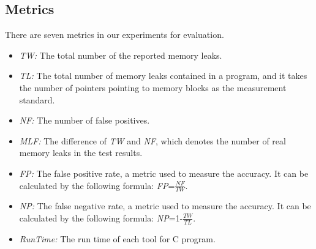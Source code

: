 \subsection{Metrics}\label{ssec:m}
There are seven metrics in our experiments for evaluation.
\begin{itemize}
\item \textit{TW:} The total number of the reported memory leaks.
\item \textit{TL:} The total number of memory leaks contained in a program, and it takes the number of pointers pointing to memory blocks as the measurement standard.
\item \textit{NF:} The number of false positives.
\item \textit{MLF:} The difference of \textit{TW} and \textit{NF}, which denotes the number of real memory leaks in the test results.
\item \textit{FP:} The false positive rate, a metric used to measure the accuracy. It can be calculated by the following formula: \textit{FP}=$\frac{\textit{NF}}{\textit{TW}}$.
\item \textit{NP:} The false negative rate, a metric used to measure the accuracy. It can be calculated by the following formula: \textit{NP}=1-$\frac{\textit{TW}}{\textit{TL}}$.
\item \textit{RunTime:} The run time of each tool for C program.
\end{itemize}